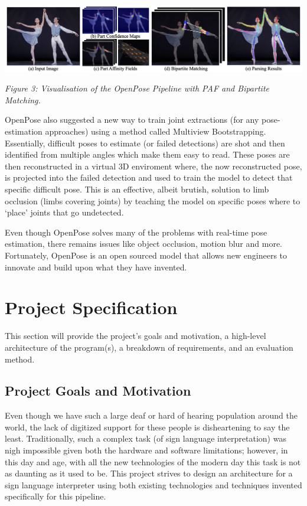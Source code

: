 \documentclass[11pt]{article}
\begin{document}
        \vskip 0.2cm
        \begin{center}
            \includegraphics[width=14cm]{images/openpose.png}
            \\
            \raggedright \textit{
            Figure 3: Visualisation of the OpenPose Pipeline with PAF and Bipartite Matching.
            }
            \cite{openpose}
        \end{center}
        \vskip 0.2cm

        OpenPose also suggested a new way to train joint extractions (for any pose-estimation approaches) using a method called Multiview Bootstrapping. Essentially, difficult poses to estimate (or failed detections) are shot and then identified from multiple angles which make them easy to read. These poses are then reconstructed in a virtual 3D enviroment where, the now reconstructed pose, is projected into the failed detection and used to train the model to detect that specific difficult pose. This is an effective, albeit brutish, solution to limb occlusion (limbs covering joints) by teaching the model on specific poses where to `place' joints that go undetected.

        Even though OpenPose solves many of the problems with real-time pose estimation, there remains issues like object occlusion, motion blur and more. Fortunately, OpenPose is an open sourced model that allows new engineers to innovate and build upon what they have invented.


\section{Project Specification}
    This section will provide the project's goals and motivation, a high-level architecture of the program(s), a breakdown of requirements, and an evaluation method.

    \subsection{Project Goals and Motivation}
        Even though we have such a large deaf or hard of hearing population around the world, the lack of digitized support for these people is disheartening to say the least. Traditionally, such a complex task (of sign language interpretation) was nigh impossible given both the hardware and software limitations; however, in this day and age, with all the new technologies of the modern day this task is not as daunting as it used to be. This project strives to design an architecture for a sign language interpreter using both existing technologies and techniques invented specifically for this pipeline.
    
\end{document}
